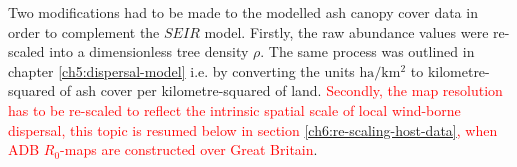Two modifications had to be made to the modelled ash canopy cover data in order to complement the $SEIR$ model. Firstly, the raw abundance values were re-scaled into a dimensionless tree density $\rho$. The same process was outlined in chapter \ref{ch5:dispersal-model} i.e. by converting the units $\mathrm{ha/km^2}$ to kilometre-squared of ash cover per kilometre-squared of land. \textcolor{red}{Secondly, the map resolution has to be re-scaled to reflect the intrinsic spatial scale of local wind-borne dispersal, this topic is resumed below in section \ref{ch6:re-scaling-host-data}, when ADB $R_0$-maps are constructed over Great Britain}.




